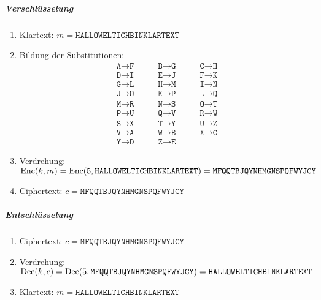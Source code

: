 				\subparagraph{Verschlüsselung}
					\begin{enumerate}
						\item[] Klartext: \( m = \texttt{HALLOWELTICHBINKLARTEXT} \)
						\item Bildung der Substitutionen:
							\begin{equation*}
								\begin{matrix*}
									\texttt{A} \rightarrow \texttt{F} & \qquad \texttt{B} \rightarrow \texttt{G} & \qquad \texttt{C} \rightarrow \texttt{H} \\
									\texttt{D} \rightarrow \texttt{I} & \qquad \texttt{E} \rightarrow \texttt{J} & \qquad \texttt{F} \rightarrow \texttt{K} \\
									\texttt{G} \rightarrow \texttt{L} & \qquad \texttt{H} \rightarrow \texttt{M} & \qquad \texttt{I} \rightarrow \texttt{N} \\
									\texttt{J} \rightarrow \texttt{O} & \qquad \texttt{K} \rightarrow \texttt{P} & \qquad \texttt{L} \rightarrow \texttt{Q} \\
									\texttt{M} \rightarrow \texttt{R} & \qquad \texttt{N} \rightarrow \texttt{S} & \qquad \texttt{O} \rightarrow \texttt{T} \\
									\texttt{P} \rightarrow \texttt{U} & \qquad \texttt{Q} \rightarrow \texttt{V} & \qquad \texttt{R} \rightarrow \texttt{W} \\
									\texttt{S} \rightarrow \texttt{X} & \qquad \texttt{T} \rightarrow \texttt{Y} & \qquad \texttt{U} \rightarrow \texttt{Z} \\
									\texttt{V} \rightarrow \texttt{A} & \qquad \texttt{W} \rightarrow \texttt{B} & \qquad \texttt{X} \rightarrow \texttt{C} \\
									\texttt{Y} \rightarrow \texttt{D} & \qquad \texttt{Z} \rightarrow \texttt{E}
								\end{matrix*}
							\end{equation*}
						\item Verdrehung: \( \operatorname{Enc}(k, m) = \operatorname{Enc}(5, \texttt{HALLOWELTICHBINKLARTEXT}) = \texttt{MFQQTBJQYNHMGNSPQFWYJCY} \)
						\item[] Ciphertext: \( c = \texttt{MFQQTBJQYNHMGNSPQFWYJCY} \)
					\end{enumerate}

				\subparagraph{Entschlüsselung}
					\begin{enumerate}
						\item[] Ciphertext: \( c = \texttt{MFQQTBJQYNHMGNSPQFWYJCY} \)
						\item Verdrehung: \( \operatorname{Dec}(k, c) = \operatorname{Dec}(5, \texttt{MFQQTBJQYNHMGNSPQFWYJCY}) = \texttt{HALLOWELTICHBINKLARTEXT} \)
						\item[] Klartext: \( m = \texttt{HALLOWELTICHBINKLARTEXT} \)
					\end{enumerate}

